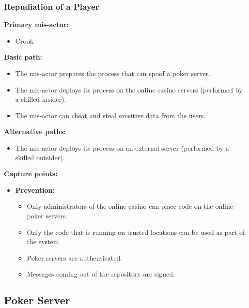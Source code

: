\documentclass[a4paper,11pt]{report}
\begin{document}
\subsubsection{Repudiation of a Player}
\textbf{Primary mis-actor:}
\begin{itemize}
\item Crook
\end{itemize}
\textbf{Basic path:}
\begin{itemize}
\item The mis-actor prepares the process that can spoof a poker server.
\item The mis-actor deploys its process on the online casino servers (performed by a skilled insider).
\item The mis-actor can cheat and steal sensitive data from the users.
\end{itemize}
\textbf{Alternative paths:}
\begin{itemize}
\item The mis-actor deploys its process on an external server (performed by a skilled outsider).
\end{itemize}
\textbf{Capture points:}
\begin{itemize}
\item \textbf{Prevention:}
\begin{itemize}
\item Only administrators of the online casino can place code on the online poker servers.
\item Only the code that is running on trusted locations can be used as part of the system.
\item Poker servers are authenticated.
\item Messages coming out of the repository are signed.
\end{itemize}
\end{itemize}

\subsection{Poker Server}
\end{document}
